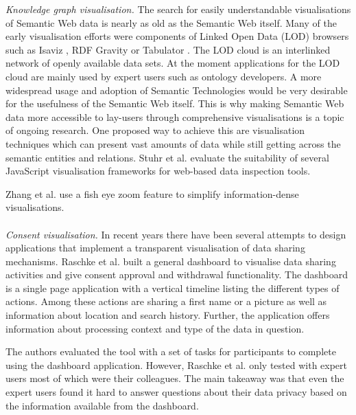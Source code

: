 \documentclass[../paper.tex]{subfiles}
\begin{document}
 \textit{Knowledge graph visualisation.} 
 The search for easily understandable visualisations of Semantic Web data is nearly as old as the Semantic Web itself.
 Many of the early visualisation efforts were components of Linked Open Data (LOD) browsers such as Isaviz \cite{isaviz}, RDF Gravity \cite{goyal2004rdfgravity} or Tabulator \cite{tabulator-berners-lee-2006}.  The LOD cloud is an interlinked network of openly available data sets.
 At the moment applications for the LOD cloud are mainly used by expert users such as ontology developers.
 A more widespread usage and adoption of Semantic Technologies would be very desirable for the usefulness of the Semantic Web itself.
 This is why making Semantic Web data more accessible to lay-users through comprehensive visualisations is a topic of ongoing research.
 One proposed way to achieve this are visualisation techniques which can present vast amounts of data while still getting across the semantic entities and relations.
 Stuhr et al. \cite{lodwheel} evaluate the suitability of several JavaScript visualisation frameworks for web-based data inspection tools.     
 
 Zhang et al. \cite{rdfFisheye} use a fish eye zoom feature to simplify information-dense visualisations.
 \\\\
 \textit{Consent visualisation.}
  In recent years there have been several attempts to design applications that
  implement a transparent visualisation of data sharing mechanisms. Raschke et al.
  \cite{core_privacy_dashboard_2018} built a general dashboard to visualise
  data sharing activities and give consent approval and withdrawal functionality.
  The dashboard is a single page application with a vertical timeline listing
  the different types of actions. Among these actions are sharing a first name
  or a picture as well as information about location and search history.
  Further, the application offers information about processing context and type
  of the data in question.

  The authors evaluated the tool with a set of tasks for participants to
  complete using the dashboard application. However, Raschke et al.
  \cite{core_privacy_dashboard_2018} only tested with expert users most of which 
  were their colleagues. The main takeaway was that even the expert users
  found it hard to answer questions about their data privacy based on the
  information available from the dashboard.
\end{document}
